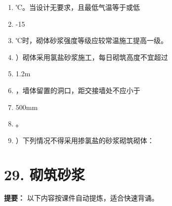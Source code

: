\documentclass[UTF8,fontset=fandol,11pt]{ctexart}
\begin{document}
\begin{enumerate}[label=\arabic*.]
\item ℃。当设计无要求，且最低气温等于或低

\item -15

\item ℃时，砌体砂浆强度等级应较常温施工提高一级。

\item ）砌体采用氯盐砂浆施工，每日砌筑高度不宜超过

\item 1.2m

\item ，墙体留置的洞口，距交接墙处不应小于

\item 500mm

\item 。

\item ）下列情况不得采用掺氯盐的砂浆砌筑砌体：

\end{enumerate}

\newpage

\section*{29. 砌筑砂浆}


\begin{mainbox}

\textbf{提要：} 以下内容按课件自动提炼，适合快速背诵。

\end{mainbox}
\end{document}
